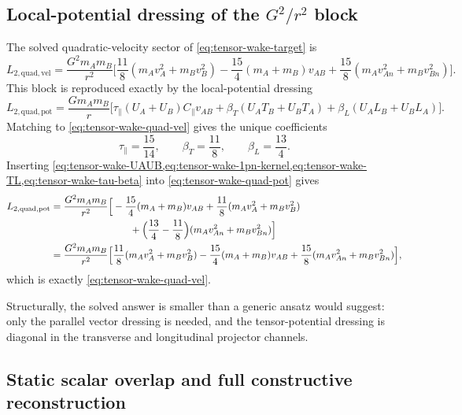 \documentclass[11pt]{article}
\begin{document}
\subsection{Local-potential dressing of the \texorpdfstring{$G^2/r^2$}{G squared over r squared} block}
\label{app:tensor-wake-local-potential}

The solved quadratic-velocity sector of \cref{eq:tensor-wake-target} is
\begin{equation}
L_{2,\mathrm{quad,vel}}
=
\frac{G^2m_A m_B}{r^2}
\Big[
\frac{11}{8}(m_Av_A^2+m_Bv_B^2)
-\frac{15}{4}(m_A+m_B)v_{AB}
+\frac{15}{8}(m_Av_{An}^2+m_Bv_{Bn}^2)
\Big].
\label{eq:tensor-wake-quad-vel}
\end{equation}
This block is reproduced exactly by the local-potential dressing
\begin{equation}
L_{2,\mathrm{quad,pot}}
=
\frac{Gm_A m_B}{r}
\Big[
\tau_{\parallel}(U_A+U_B)C_{\parallel}v_{AB}
+\beta_T(U_AT_B+U_BT_A)
+\beta_L(U_AL_B+U_BL_A)
\Big].
\label{eq:tensor-wake-quad-pot}
\end{equation}
Matching to \cref{eq:tensor-wake-quad-vel} gives the unique coefficients
\begin{equation}
\tau_{\parallel}=\frac{15}{14},
\qquad
\beta_T=\frac{11}{8},
\qquad
\beta_L=\frac{13}{4}.
\label{eq:tensor-wake-tau-beta}
\end{equation}
Inserting \cref{eq:tensor-wake-UAUB,eq:tensor-wake-1pn-kernel,eq:tensor-wake-TL,eq:tensor-wake-tau-beta}
into \cref{eq:tensor-wake-quad-pot} gives
\begin{align}
L_{2,\mathrm{quad,pot}}
={}&
\frac{G^2m_A m_B}{r^2}
\Big[
-\frac{15}{4}(m_A+m_B)v_{AB}
+\frac{11}{8}(m_Av_A^2+m_Bv_B^2)
\notag\\
&\hspace{6.8em}
+\Bigl(\frac{13}{4}-\frac{11}{8}\Bigr)(m_Av_{An}^2+m_Bv_{Bn}^2)
\Big]
\notag\\
={}&
\frac{G^2m_A m_B}{r^2}
\Big[
\frac{11}{8}(m_Av_A^2+m_Bv_B^2)
-\frac{15}{4}(m_A+m_B)v_{AB}
+\frac{15}{8}(m_Av_{An}^2+m_Bv_{Bn}^2)
\Big],
\label{eq:tensor-wake-quad-pot-expanded}
\end{align}
which is exactly \cref{eq:tensor-wake-quad-vel}.

Structurally, the solved answer is smaller than a generic ansatz would suggest:
only the parallel vector dressing is needed, and the tensor-potential dressing is diagonal
in the transverse and longitudinal projector channels.

\subsection{Static scalar overlap and full constructive reconstruction}
\label{app:tensor-wake-full}
\end{document}
